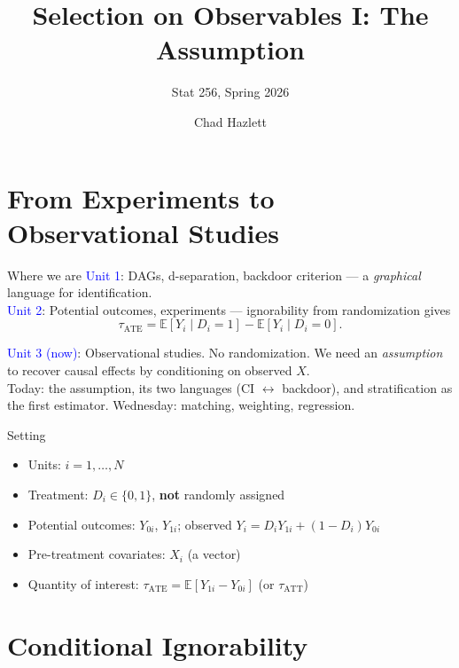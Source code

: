 \documentclass[xcolor=dvipsnames]{beamer}
\title[SOO I]{Selection on Observables I: The Assumption}
\subtitle[ ]{Stat 256, Spring 2026}
\author[Hazlett]{Chad Hazlett}
\institute[UCLA]{UCLA\\[1ex]
  \texttt{chazlett@ucla.edu}
}
\date{}
\newcommand\E{\mathbb{E}}
\begin{document}
\begin{frame}
  \titlepage
\end{frame}


\section{From Experiments to Observational Studies}

\begin{frame}{Where we are}
\small
{} \textcolor{Blue}{Unit 1}: DAGs, d-separation, backdoor criterion --- a \textit{graphical} language for identification.\\[4pt]

 \textcolor{Blue}{Unit 2}: Potential outcomes, experiments --- ignorability from randomization gives
$$\tau_{\text{ATE}} = \E[Y_i \mid D_i\!=\!1] - \E[Y_i \mid D_i\!=\!0].$$

 \textcolor{Blue}{Unit 3 (now)}: Observational studies. No randomization. We need an \textit{assumption} to recover causal effects by conditioning on observed $X$.\\[4pt]

 Today: the assumption, its two languages (CI $\leftrightarrow$ backdoor), and stratification as the first estimator. Wednesday: matching, weighting, regression.
\end{frame}


\begin{frame}{Setting}
\small
{}
\begin{itemize}
\item Units: $i = 1, \ldots, N$
\item Treatment: $D_i \in \{0,1\}$, \textbf{not} randomly assigned
\item Potential outcomes: $Y_{0i}$, $Y_{1i}$; observed $Y_i = D_i Y_{1i} + (1-D_i) Y_{0i}$
\item Pre-treatment covariates: $X_i$ (a vector)
\item Quantity of interest: $\tau_{\text{ATE}} = \E[Y_{1i} - Y_{0i}]$ (or $\tau_{\text{ATT}}$)
\end{itemize}
\end{frame}


\section{Conditional Ignorability}
\end{document}
